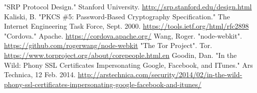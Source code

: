\documentclass[conference]{IEEEtran}
\begin{document}
\begin{thebibliography}{14}
 "SRP Protocol Design." Stanford University. \url{http://srp.stanford.edu/design.html}
 Kaliski, B. "PKCS \#5: Password-Based Cryptography Specification." The Internet Engineering Task Force, Sept. 2000. \url{https://tools.ietf.org/html/rfc2898}
 "Cordova." Apache. \url{https://cordova.apache.org/}
 Wang, Roger. "node-webkit". \url{https://github.com/rogerwang/node-webkit}
 "The Tor Project". Tor. \url{https://www.torproject.org/about/corepeople.html.en}
 Goodin, Dan. "In the Wild: Phony SSL Certificates Impersonating Google, Facebook, and ITunes." Ars Technica, 12 Feb. 2014. \url{http://arstechnica.com/security/2014/02/in-the-wild-phony-ssl-certificates-impersonating-google-facebook-and-itunes/}
\end{thebibliography}
\end{document}
